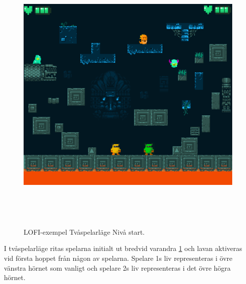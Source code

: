 \documentclass{TDP005mall}
\begin{document}
\newpage
\begin{figure}[h!]
  \caption{LOFI-exempel Tvåspelarläge Nivå start.\label{fig:8}}
  \centerline{\includegraphics[width=\textwidth, height=14cm]{images/game_example_2p.png}}  
\end{figure}
I tvåspelarläge ritas spelarna initialt ut bredvid varandra \ref{fig:8} och lavan aktiveras vid första hoppet från någon av spelarna. Spelare 1s liv representeras i övre vänstra hörnet som vanligt och spelare 2s liv representeras i det övre högra hörnet.
\end{document}
